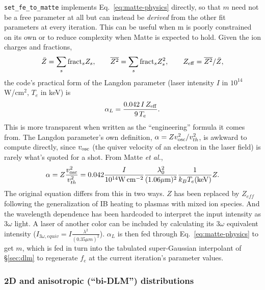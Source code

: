\documentclass[11pt]{article}
\newcommand{\code}[1]{\texttt{#1}}
\begin{document}
\code{set\_fe\_to\_matte} implements Eq.~\ref{eq:matte-physics} directly, so that $m$ need
not be a free parameter at all but can instead be \emph{derived} from the other fit
parameters at every iteration. This can be useful when m is poorly constrained on its own or to reduce complexity when Matte is expected to hold. Given the ion charges and fractions,
\begin{equation}
  \bar Z=\sum_s\mathrm{fract}_sZ_s, \qquad \overline{Z^2}=\sum_s\mathrm{fract}_sZ_s^2,
  \qquad Z_{\rm eff}=\overline{Z^2}/\bar Z,
\end{equation}
the code's practical form of the Langdon parameter (laser intensity $I$ in $10^{14}$ W/cm$^2$, $T_e$ in keV) is
\begin{equation}
  \alpha_L = \frac{0.042\,I\,Z_{\rm eff}}{9\,T_e}.
\end{equation}
This is more transparent when written as the ``engineering'' formula it comes from. The
Langdon parameter's own definition, $\alpha=Zv_{\rm osc}^2/v_{th}^2$, is awkward to
compute directly, since $v_{\rm osc}$ (the quiver velocity of an electron in the laser
field) is rarely what's quoted for a shot. From Matte \textit{et al.},
\begin{equation}\label{eq:langdon-engineering}
  \alpha = Z\frac{v_{\rm osc}^2}{v_{th}^2} = 0.042\frac{I}{10^{14} \si{W.cm^{-2}}}\frac{\lambda_0^2}{(1.06 \si{\mu m})^2}\frac{1}{k_B T_e (\si{keV})}Z.
\end{equation}
The original equation differs from this in two ways. $Z$ has been replaced by $Z_{eff}$ following the generalization of IB heating to plasmas with mixed ion species. And the wavelength dependence has been hardcoded to interpret the input intensity as $3\omega$ light. A laser of another color can be included by calculating its $3\omega$ equivalent intensity ($I_{3\omega, equiv} = I \frac{\lambda^2}{(0.35\si{\mu m})^2}$). 
$\alpha_L$ is then fed through Eq.~\ref{eq:matte-physics} to get $m$, which is fed in turn into the
tabulated super-Gaussian interpolant of \S\ref{sec:dlm} to regenerate $f_e$ at the current
iteration's parameter values.

\subsubsection{2D and anisotropic (``bi-DLM'') distributions}
\end{document}
